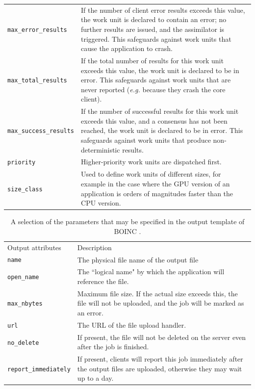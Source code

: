 \begin{table}
\begin{tabular}{lp{11.5cm}}
\verb|max_error_results| &
If the number of client error results exceeds this value, the work unit is declared to contain an error; no further results are issued, and the assimilator is triggered. This safeguards against work units that cause the application to crash.
\\
\verb|max_total_results| & If the total number of results for this work unit   exceeds this value, the work unit is declared to be in error. This safeguards against work units that are never reported (\emph{e.g.} because they crash the core client).
\\
\verb|max_success_results| & If the number of successful results for this work unit exceeds this value, and a consensus has not been reached, the work unit is declared to be in error. This safeguards against work units that produce non-deterministic results.
\\
\verb|priority| &  Higher-priority work units are dispatched first. \\
\verb|size_class| & Used to define work units of different sizes, for example in the case where the GPU version of an application is orders of magnitudes faster than the CPU version. \\ \bottomrule
\end{tabular} \label{tab:intemplate}
\end{table}

\begin{table} 
\caption{A selection of the parameters that may be specified in the output template of BOINC \cite{boincwiki}.}
\begin{tabular}{lp{11.6cm}}\toprule
Output attributes & Description \cite{boincwiki}    \\ \cmidrule(r){1-2}
 \verb|name| & The physical file name of the output file\\
\verb|open_name| & The ``logical name" by which the application will reference the file.\\
\verb|max_nbytes| & Maximum file size. If the actual size exceeds this, the file will not be uploaded, and the job will be marked as an error.\\
\verb|url| & The URL of the file upload handler. \\ 
\verb|no_delete| & If present, the file will not be deleted on the server even after the job is finished.\\
\verb|report_immediately| & If present, clients will report this job immediately after the output files are uploaded, otherwise they may wait up to a day. 
\\  \bottomrule
\end{tabular}\label{tab:outtemplate}
\end{table}


